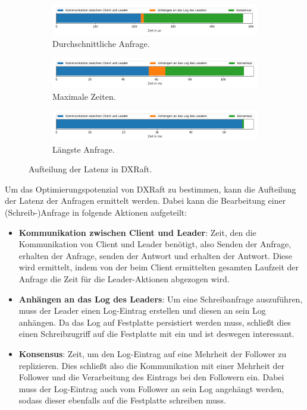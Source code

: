 \begin{figure}[t]
	\centering
	\begin{subfigure}[t]{1\textwidth}
		\includegraphics[width=\textwidth]{img/request_avg_timing.png}
		\caption{Durchschnittliche Anfrage.}
		\label{fig:request-avg}
	\end{subfigure}
	\begin{subfigure}[t]{1\textwidth}
		\includegraphics[width=\textwidth]{img/request_max_timing.png}
		\caption{Maximale Zeiten.}
		\label{fig:request-max}
	\end{subfigure}
	\begin{subfigure}[t]{1\textwidth}
		\includegraphics[width=\textwidth]{img/request_longest_timing.png}
		\caption{Längste Anfrage.}
		\label{fig:request-longest}
	\end{subfigure}
	\caption{Aufteilung der Latenz in DXRaft.}
	\label{fig:latency-analysis}
\end{figure}

Um das Optimierungspotenzial von DXRaft zu bestimmen, kann die Aufteilung der Latenz der Anfragen ermittelt werden. Dabei kann die Bearbeitung einer (Schreib-)Anfrage in folgende Aktionen aufgeteilt:
\begin{itemize}
	\item \textbf{Kommunikation zwischen Client und Leader}: Zeit, den die Kommunikation von Client und Leader benötigt, also Senden der Anfrage, erhalten der Anfrage, senden der Antwort und erhalten der Antwort. Diese wird ermittelt, indem von der beim Client ermittelten gesamten Laufzeit der Anfrage die Zeit für die Leader-Aktionen abgezogen wird.
	\item \textbf{Anhängen an das Log des Leaders}: Um eine Schreibanfrage auszuführen, muss der Leader einen Log-Eintrag erstellen und diesen an sein Log anhängen. Da das Log auf Festplatte persistiert werden muss, schließt dies einen Schreibzugriff auf die Festplatte mit ein und ist deswegen interessant.
	\item \textbf{Konsensus}: Zeit, um den Log-Eintrag auf eine Mehrheit der Follower zu replizieren. Dies schließt also die Kommunikation mit einer Mehrheit der Follower und die Verarbeitung des Eintrags bei den Followern ein. Dabei muss der Log-Eintrag auch vom Follower an sein Log angehängt werden, sodass dieser ebenfalls auf die Festplatte schreiben muss.
\end{itemize}

